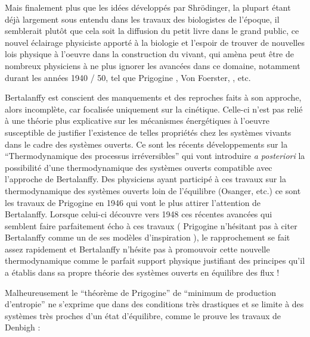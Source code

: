 Mais finalement plus que les idées développés par Shrödinger, la plupart étant déjà largement sous entendu dans les travaux des biologistes de l'époque, il semblerait plutôt que cela soit la diffusion du petit livre dans le grand public, ce nouvel éclairage physiciste apporté à la biologie \autocite[482]{Pouvreau2013} et l'espoir de trouver de nouvelles lois physique à l'oeuvre dans la construction du vivant, qui amèna peut être de nombreux physiciens à ne plus ignorer les avancées dans ce domaine, notamment durant les années 1940 / 50, tel que Prigogine \autocite[77]{Prigogine1996}, Von Foerster, \autocite[73]{Lemoigne1977}, etc. 

Bertalanffy est conscient des manquements et des reproches faits à son approche, alors incomplète, car focalisée uniquement sur la cinétique. Celle-ci n'est pas relié à une théorie plus explicative sur les mécanismes énergétiques à l'oeuvre susceptible de justifier l'existence de telles propriétés chez les systèmes vivants dans le cadre des systèmes ouverts. Ce sont les récents développements sur la \enquote{Thermodynamique des processus irréversibles} qui vont introduire \textit{a posteriori} la possibilité d'une thermodynamique des systèmes ouverts compatible avec l'approche de Bertalanffy. Des physiciens ayant participé à ces travaux sur la thermodynamique des systèmes ouverts loin de l'équilibre (Osanger, etc.) ce sont les travaux de Prigogine en 1946 \autocite{Prigogine1946} qui vont le plus attirer l'attention de Bertalanffy. Lorsque celui-ci découvre vers 1948 ces récentes avancées qui semblent faire parfaitement écho à ces travaux ( Prigogine n'hésitant pas à citer Bertalanffy comme un de ses modèles d'inspiration \autocite{Prigogine1996}), le rapprochement se fait assez rapidement et Bertalanffy n'hésite pas à promouvoir cette nouvelle thermodynamique comme le parfait support physique justifiant des principes qu'il a établis dans sa propre théorie des systèmes ouverts en équilibre des flux ! \autocite[653-658]{Pouvreau2013}

Malheureusement le \enquote{théorème de Prigogine} de \enquote{minimum de production d'entropie} ne s'exprime que dans des conditions très drastiques \autocite[53]{Lebon2008} et se limite à des systèmes très proches d'un état d'équilibre, comme le prouve les travaux de Denbigh :  

